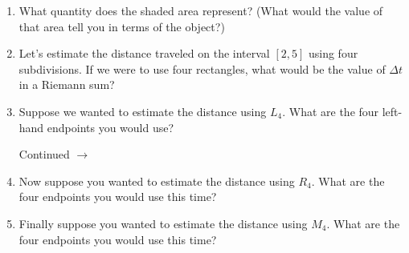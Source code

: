 \documentclass[11pt]{article}
\def\ra{\rightarrow}
\def\pageturn{\vfill 
\begin{flushright}
	\begin{small}
		Continued $\ra$
	\end{small}
\end{flushright} \newpage}
\begin{document}
\begin{enumerate}
	\item What quantity does the shaded area represent? (What would the value of that area tell you in terms of the object?) 
	
	\vspace{0.7in}
	
	\item Let's estimate the distance traveled on the interval $[2,5]$ using four subdivisions. If we were to use four rectangles, what would be the value of $\Delta t$ in a Riemann sum? 
	
	\vspace{0.7in}
	
	
	\item Suppose we wanted to estimate the distance using $L_4$. What are the four left-hand endpoints you would use? 
	
\pageturn	
	
	\item Now suppose you wanted to estimate the distance using $R_4$. What are the four endpoints you would use this	 time? 
	
	\vspace{0.7in}
	\item Finally suppose you wanted to estimate the distance using $M_4$. What are the four endpoints you would use this time?
	
	
	\vspace{0.7in}
		

\end{enumerate}
\end{document}
